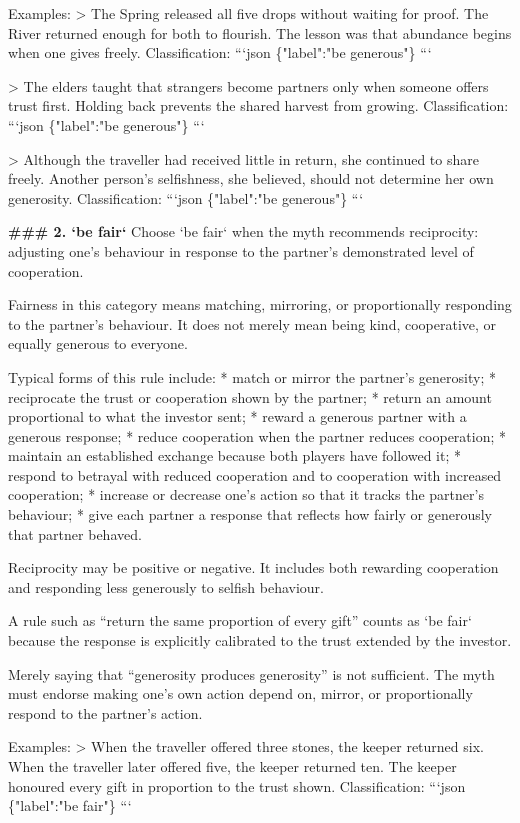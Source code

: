 \begin{promptboxcompact}
Examples: > The Spring released all five drops without waiting for proof. The River returned enough for both to flourish. The lesson was that abundance begins when one gives freely. Classification: ```json \{"label":"be generous"\} ```

> The elders taught that strangers become partners only when someone offers trust first. Holding back prevents the shared harvest from growing. Classification: ```json \{"label":"be generous"\} ```

> Although the traveller had received little in return, she continued to share freely. Another person’s selfishness, she believed, should not determine her own generosity. Classification: ```json \{"label":"be generous"\} ```

\textbf{\#\#\# 2. `be fair`} Choose `be fair` when the myth recommends reciprocity: adjusting one’s behaviour in response to the partner’s demonstrated level of cooperation.

Fairness in this category means matching, mirroring, or proportionally responding to the partner’s behaviour. It does not merely mean being kind, cooperative, or equally generous to everyone.

Typical forms of this rule include: * match or mirror the partner’s generosity; * reciprocate the trust or cooperation shown by the partner; * return an amount proportional to what the investor sent; * reward a generous partner with a generous response; * reduce cooperation when the partner reduces cooperation; * maintain an established exchange because both players have followed it; * respond to betrayal with reduced cooperation and to cooperation with increased cooperation; * increase or decrease one’s action so that it tracks the partner’s behaviour; * give each partner a response that reflects how fairly or generously that partner behaved.

Reciprocity may be positive or negative. It includes both rewarding cooperation and responding less generously to selfish behaviour.

A rule such as “return the same proportion of every gift” counts as `be fair` because the response is explicitly calibrated to the trust extended by the investor.

Merely saying that “generosity produces generosity” is not sufficient. The myth must endorse making one’s own action depend on, mirror, or proportionally respond to the partner’s action.

Examples: > When the traveller offered three stones, the keeper returned six. When the traveller later offered five, the keeper returned ten. The keeper honoured every gift in proportion to the trust shown. Classification: ```json \{"label":"be fair"\} ```


\end{promptboxcompact}
